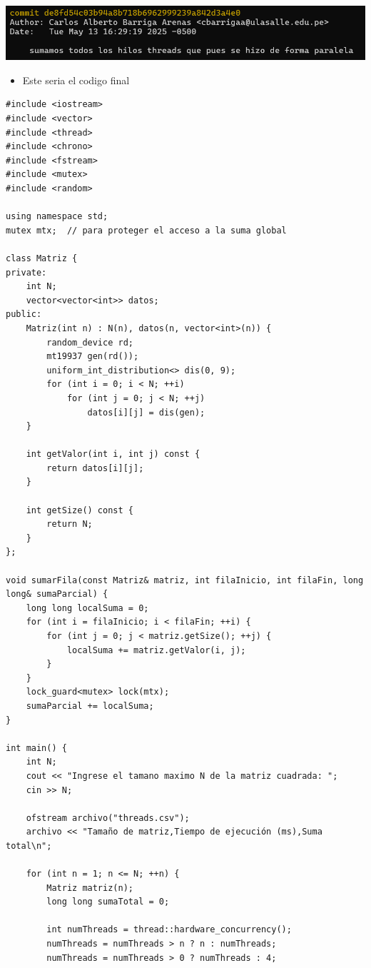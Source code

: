 \documentclass{article}
\begin{document}
	\includegraphics[width=1\textwidth]{img/commit_4.png}


	\begin{itemize}	
		\item Este seria el codigo final

	\end{itemize}


 
  	\begin{lstlisting}
#include <iostream>
#include <vector>
#include <thread>
#include <chrono>
#include <fstream>
#include <mutex>
#include <random>

using namespace std;
mutex mtx;  // para proteger el acceso a la suma global

class Matriz {
private:
    int N;
    vector<vector<int>> datos;
public:
    Matriz(int n) : N(n), datos(n, vector<int>(n)) {
        random_device rd;
        mt19937 gen(rd());
        uniform_int_distribution<> dis(0, 9);
        for (int i = 0; i < N; ++i)
            for (int j = 0; j < N; ++j)
                datos[i][j] = dis(gen);
    }

    int getValor(int i, int j) const {
        return datos[i][j];
    }

    int getSize() const {
        return N;
    }
};

void sumarFila(const Matriz& matriz, int filaInicio, int filaFin, long long& sumaParcial) {
    long long localSuma = 0;
    for (int i = filaInicio; i < filaFin; ++i) {
        for (int j = 0; j < matriz.getSize(); ++j) {
            localSuma += matriz.getValor(i, j);
        }
    }
    lock_guard<mutex> lock(mtx);
    sumaParcial += localSuma;
}

int main() {
    int N;
    cout << "Ingrese el tamano maximo N de la matriz cuadrada: ";
    cin >> N;

    ofstream archivo("threads.csv");
    archivo << "Tamaño de matriz,Tiempo de ejecución (ms),Suma total\n";

    for (int n = 1; n <= N; ++n) {
        Matriz matriz(n);
        long long sumaTotal = 0;

        int numThreads = thread::hardware_concurrency();
        numThreads = numThreads > n ? n : numThreads;
        numThreads = numThreads > 0 ? numThreads : 4;


\end{lstlisting}
\end{document}
